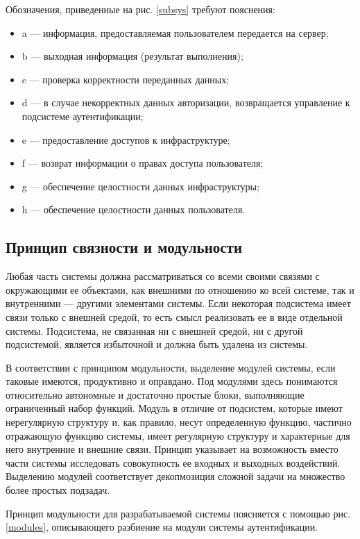 Обозначения, приведенные на рис. \ref{subsys} требуют пояснения:
\begin{itemize}[label={}]
  \item a --- информация, предоставляемая пользователем передается на сервер;
  \item b --- выходная информация (результат выполнения);
  \item c --- проверка корректности переданных данных;
  \item d --- в случае некорректных данных авторизации, возвращается управление к подсистеме аутентификации;
  \item e --- предоставление доступов к инфраструктуре;
  \item f --- возврат информации о правах доступа пользователя;
  \item g --- обеспечение целостности данных инфраструктуры;
  \item h --- обеспечение целостности данных пользователя.
\end{itemize}

\subsection{Принцип связности и модульности}

Любая часть системы должна рассматриваться со всеми своими связями с окружающими ее объектами, как внешними по отношению ко всей системе, так и внутренними --- другими элементами системы.
Если некоторая подсистема имеет связи только с внешней средой, то есть смысл реализовать ее в виде отдельной системы.
Подсистема, не связанная ни с внешней средой, ни с другой подсистемой, является избыточной и должна быть удалена из системы.

В соответствии с принципом модульности, выделение модулей системы, если таковые имеются, продуктивно и оправдано.
Под модулями здесь понимаются относительно автономные и достаточно простые блоки, выполняющие ограниченный набор функций.
Модуль в отличие от подсистем, которые имеют нерегулярную структуру и, как правило, несут определенную функцию, частично отражающую функцию системы, имеет регулярную структуру и характерные для него внутренние и внешние связи.
Принцип указывает на возможность вместо части системы исследовать совокупность ее входных и выходных воздействий.
Выделению модулей соответствует декопмозиция сложной задачи на множество более простых подзадач.

Принцип модульности для разрабатываемой системы поясняется с помощью рис. \ref{modules}, описывающего разбиение на модули системы аутентификации.

